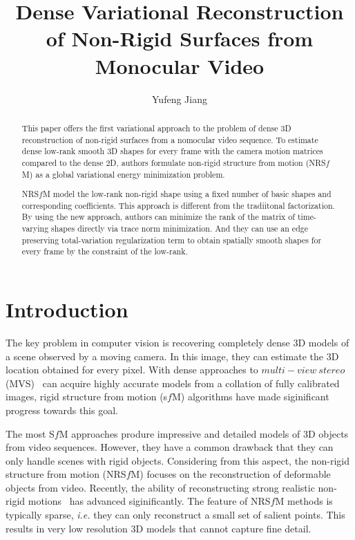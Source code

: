 \documentclass[10pt,twocolumn,letterpaper]{article}
\begin{document}
\title{Dense Variational Reconstruction of Non-Rigid Surfaces from Monocular Video}
\author{Yufeng Jiang}
\maketitle

\begin{abstract}

This paper offers the first variational approach to the problem of dense 3D reconstruction of non-rigid surfaces from a nomocular video sequence. To estimate dense low-rank smooth 3D shapes for every frame with the camera motion matrices compared to the dense 2D, authors formulate non-rigid structure from motion (NRS$f$M) as a global variational energy minimization problem. 

NRS$f$M model the low-rank non-rigid shape using a fixed number of basic shapes and corresponding coefficients. This approach is different from the tradiitonal factorization. By using the new approach, authors can minimize the rank of the matrix of time-varying shapes directly via trace norm minimization. And they can use an edge preserving total-variation regularization term to obtain spatially smooth shapes for every frame by the constraint of the low-rank. 

\end{abstract}

\section{Introduction}

The key problem in computer vision is recovering completely dense 3D models of a scene observed by a moving camera. In this image, they can estimate the 3D location obtained for every pixel. With dense approaches to $multi-view~stereo$ (MVS)~\cite{Accurate,comparison} can acquire highly accurate models from a collation of fully calibrated images, rigid structure from motion (s$f$M) algorithms have made siginificant progress towards this goal. 

The most S$f$M approaches produre impressive and detailed models of 3D objects from video sequences. However, they have a common drawback that they can only handle scenes with rigid objects. Considering from this aspect, the non-rigid structure from motion (NRS$f$M) focuses on the reconstruction of deformable objects from video. Recently, the ability of reconstructing strong realistic non-rigid motions~\cite{Locally,Energy,Non} has advanced siginificantly. The feature of NRS$f$M methods is typically sparse, \emph{i.e.} they can only reconstruct a small set of salient points. This results in very low resolution 3D models that cannot capture fine detail.
\end{document}
